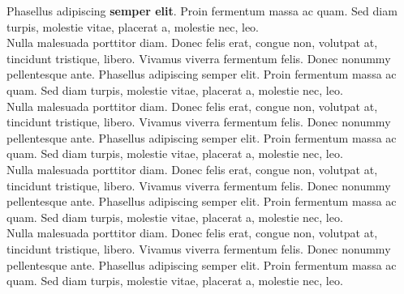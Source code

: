 \documentclass[theme]{si_template/en_cv}
\begin{document}
\begin{paracol}{2}
\begin{rightcolumn}
{            Phasellus adipiscing \textbf{semper elit}. Proin fermentum massa ac quam. Sed diam turpis, molestie vitae, placerat a, molestie nec, leo.}
            \vspace{\itemspace}\\
            {Nulla malesuada porttitor diam. Donec felis erat, congue non, volutpat at, tincidunt tristique, libero. Vivamus viverra fermentum felis. Donec nonummy pellentesque ante. Phasellus adipiscing semper elit. Proin fermentum massa ac quam. Sed diam turpis, molestie vitae, placerat a, molestie nec, leo.}
            \vspace{\itemspace}\\
            {Nulla malesuada porttitor diam. Donec felis erat, congue non, volutpat at, tincidunt tristique, libero. Vivamus viverra fermentum felis. Donec nonummy pellentesque ante. Phasellus adipiscing semper elit. Proin fermentum massa ac quam. Sed diam turpis, molestie vitae, placerat a, molestie nec, leo.}
            \vspace{\itemspace}\\
            {Nulla malesuada porttitor diam. Donec felis erat, congue non, volutpat at, tincidunt tristique, libero. Vivamus viverra fermentum felis. Donec nonummy pellentesque ante. Phasellus adipiscing semper elit. Proin fermentum massa ac quam. Sed diam turpis, molestie vitae, placerat a, molestie nec, leo.}
            \vspace{\itemspace}\\
            {Nulla malesuada porttitor diam. Donec felis erat, congue non, volutpat at, tincidunt tristique, libero. Vivamus viverra fermentum felis. Donec nonummy pellentesque ante. Phasellus adipiscing semper elit. Proin fermentum massa ac quam. Sed diam turpis, molestie vitae, placerat a, molestie nec, leo.}
            \vspace{\itemspace}\\

\end{rightcolumn}
\end{paracol}
\end{document}
